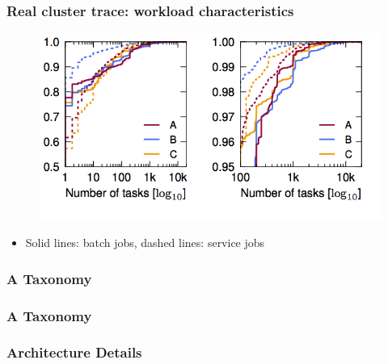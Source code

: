 \begin{frame}\frametitle{Real cluster trace: workload characteristics}
\begin{figure}[h]
  \centering
  \includegraphics[scale=0.4]{./figures/intro_trace2}
  \label{fig:intro_trace2}
\end{figure}
\begin{itemize}
	\item Solid lines: batch jobs, dashed lines: service jobs
\end{itemize}
\end{frame}

\begin{frame}\frametitle{A Taxonomy}

\end{frame}


\begin{frame}\frametitle{A Taxonomy}

\end{frame}

\begin{frame}\frametitle{Architecture Details}

\end{frame}
